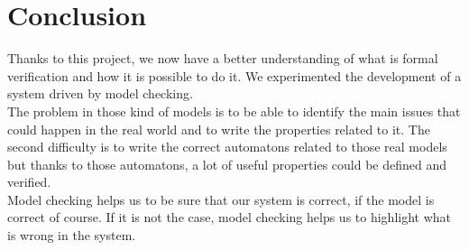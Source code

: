 \section{Conclusion}
Thanks to this project, we now have a better understanding of what is formal verification and how it is possible to do it. We experimented the development of a system driven by model checking. \\
The problem in those kind of models is to be able to identify the main issues that could happen in the real world and to write the properties related to it. The second difficulty is to write the correct automatons related to those real models but thanks to those automatons, a lot of useful properties could be defined and verified.\\
Model checking helps us to be sure that our system is correct, if the model is correct of course. If it is not the case, model checking helps us to highlight what is wrong in the system. 